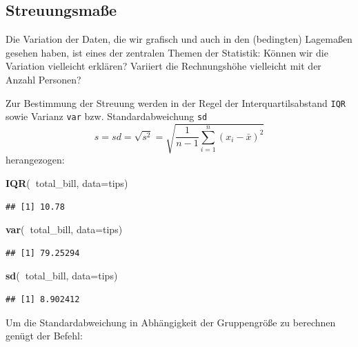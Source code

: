 \documentclass[12pt,ngerman,paper=a4,pagesize,DIV=13]{scrreprt}
\newenvironment{Shaded}{\begin{snugshade}}{\end{snugshade}}
\newcommand{\DataTypeTok}[1]{\textcolor[rgb]{0.13,0.29,0.53}{#1}}
\newcommand{\KeywordTok}[1]{\textcolor[rgb]{0.13,0.29,0.53}{\textbf{#1}}}
\newcommand{\NormalTok}[1]{#1}
\newcommand{\OperatorTok}[1]{\textcolor[rgb]{0.81,0.36,0.00}{\textbf{#1}}}
\begin{document}
\hypertarget{streuungsmae}{%
\subsection{Streuungsmaße}\label{streuungsmae}}

Die Variation der Daten, die wir grafisch und auch in den (bedingten)
Lagemaßen gesehen haben, ist eines der zentralen Themen der Statistik:
Können wir die Variation vielleicht erklären? Variiert die Rechnungshöhe
vielleicht mit der Anzahl Personen?

Zur Bestimmung der Streuung werden in der Regel der Interquartilsabstand
\texttt{IQR} sowie Varianz \texttt{var} bzw. Standardabweichung
\texttt{sd}
\[s=sd=\sqrt{s^2}=\sqrt{\frac{1}{n-1}\sum_{i=1}^{n}(x_{i}-\bar{x})^2}\]
herangezogen:

\begin{Shaded}
\begin{Highlighting}[]
\KeywordTok{IQR}\NormalTok{(}\OperatorTok{~}\NormalTok{total_bill, }\DataTypeTok{data=}\NormalTok{tips)}
\end{Highlighting}
\end{Shaded}

\begin{verbatim}
## [1] 10.78
\end{verbatim}

\begin{Shaded}
\begin{Highlighting}[]
\KeywordTok{var}\NormalTok{(}\OperatorTok{~}\NormalTok{total_bill, }\DataTypeTok{data=}\NormalTok{tips)}
\end{Highlighting}
\end{Shaded}

\begin{verbatim}
## [1] 79.25294
\end{verbatim}

\begin{Shaded}
\begin{Highlighting}[]
\KeywordTok{sd}\NormalTok{(}\OperatorTok{~}\NormalTok{total_bill, }\DataTypeTok{data=}\NormalTok{tips)}
\end{Highlighting}
\end{Shaded}

\begin{verbatim}
## [1] 8.902412
\end{verbatim}

Um die Standardabweichung in Abhängigkeit der Gruppengröße zu berechnen
genügt der Befehl:
\end{document}
